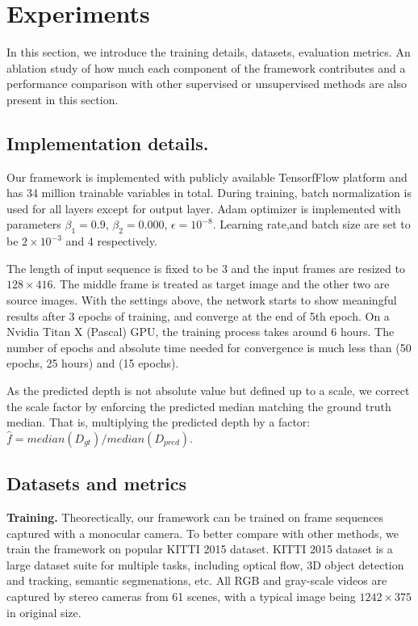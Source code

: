 \section{Experiments}
\label{sec:experiments}

In this section, we introduce the training details, datasets, evaluation metrics. An ablation study of how much each component of the framework contributes and a performance comparison with other supervised or unsupervised methods are also present in this section.

\subsection{Implementation details.}

Our framework is implemented with publicly available TensorfFlow \cite{abadi2016tensorflow} platform and has 34 million trainable variables in total. During training, batch normalization \cite{ioffe2015batch} is used for all layers except for output layer. Adam optimizer is implemented with parameters $\beta_1 = 0.9$, $\beta_2=0.000$, $\epsilon=10^{-8}$. Learning rate,and batch size are set to be $2\times10^{-3}$ and 4 respectively.

The length of input sequence is fixed to be 3 and the input frames are resized to $128 \times 416$. The middle frame is treated as target image and the other two are source images. With the settings above, the network starts to show meaningful results after 3 epochs of training, and converge at the end of 5th epoch. On a Nvidia Titan X (Pascal) GPU, the training process takes around 6 hours. The number of epochs and absolute time needed for convergence is much less than \cite{godard2016unsupervised} (50 epochs, 25 hours) and \cite{zhou2017unsupervised} (15 epochs).

As the predicted depth is not absolute value but defined up to a scale, we correct the scale factor by enforcing the predicted median matching the ground truth median. That is, multiplying the predicted depth by a factor: $\hat{f} = median(D_{gt}) / median(D_{pred})$. 

\subsection{Datasets and metrics}
\textbf{Training.}
Theorectically, our framework can be trained on frame sequences captured with a monocular camera. To better compare with other methods, we train the framework on popular KITTI 2015 \cite{geiger2012we} dataset. KITTI 2015 dataset is a large dataset suite for multiple tasks, including optical flow, 3D object detection and tracking, semantic segmenations, etc. All RGB and gray-scale videos are captured by stereo cameras from 61 scenes, with a typical image being $1242 \times 375$ in original size.

